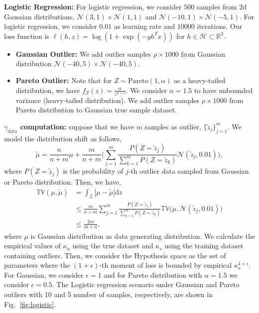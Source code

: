 \documentclass{article}
\theoremstyle{plain}
\theoremstyle{plain}
\theoremstyle{definition}
\theoremstyle{remark}
\newcommand{\mrd}{\mathrm{d}}
\begin{document}
\textbf{Logistic Regression:} For logistic regression,  we consider $500$ samples from 2d Gaussian distributions, $\mathcal{N}(3,1)\times\mathcal{N}(1,1)$ and $\mathcal{N}(-10,1)\times\mathcal{N}(-5,1)$. For logistic regression, we consider $0.01$ as learning rate and $10000$ iterations. Our loss function is $\ell(h,z)=\log(1+\exp(-yh^Tx))$ for $h\in\mathcal{H}\subset \mathbb{R}^2$.
\begin{itemize}
    \item \textbf{Gaussian Outlier:} We  add outlier samples $\rho\times1000$ from Gaussian distribution $\mathcal{N}(-40,5)\times \mathcal{N}(-40,5)$.
    \item \textbf{Pareto Outlier:} Note that for $Z \sim \mathrm{Pareto}(1, \alpha)$ as a heavy-tailed distribution, we have $f_Z(z)=\frac{\alpha}{z^{\alpha + 1}}$. We consider $\alpha=1.5$ to have unbounded variance (heavy-tailed distribution). We  add outlier samples $\rho\times1000$ from Pareto distribution to Gaussian true sample dataset.
\end{itemize}

\textbf{$\gamma_{\text{data}}$ computation:} suppose that we have $m$ samples as outlier, $\{\tilde{z}_j\}_{j=1}^m$. We model the distribution shift as follows,
\begin{equation}
    \tilde{\mu}=\frac{n}{n+m} \mu + \frac{m}{n+m}\Big( \sum_{j=1}^m \frac{P(Z=\tilde{z}_j)}{\sum_{k=1}^m P(Z=\tilde{z}_k)}\mathcal{N}(\tilde{z}_j,0.01) \Big),
\end{equation}
 where $P(Z=\tilde{z}_j)$ is the probability of $j$-th outlier data sampled from Gaussian or Pareto distribution. Then, we have,
 \begin{equation}
 \begin{split}
          \mathbb{TV}(\mu,\tilde{\mu})&=\int_{\mathcal{Z}}|\mu-\tilde{\mu}|\mrd z\\
          &\leq \frac{m}{n+m}\sum_{j=1}^m \frac{P(Z=\tilde{z}_j)}{\sum_{k=1}^m P(Z=\tilde{z}_k)}  \mathbb{TV}\big(\mu,\mathcal{N}(\tilde{z}_j,0.01)\big)\\
          &\leq \frac{2m}{m+n},
 \end{split}
 \end{equation}
 where $\mu$ is Gaussian distribution as data generating distribution.
We calculate the empirical values of $\kappa_u$ using the true dataset and $\kappa_s$ using the training dataset containing outliers. Then, we consider the Hypothesis space as the set of parameters where the $(1+\epsilon)$-th moment of loss is bounded by empirical $\kappa_s^{1+\epsilon}$. For Gaussian, we consider $\epsilon=1$ and for Pareto distribution with $\alpha=1.5$ we consider $\epsilon=0.5$. The Logistic regression scenario under Gaussian and Pareto outliers with 10 and 5 number of samples, respectively, are shown in Fig.~\ref{fig:logistic}.
\end{document}
